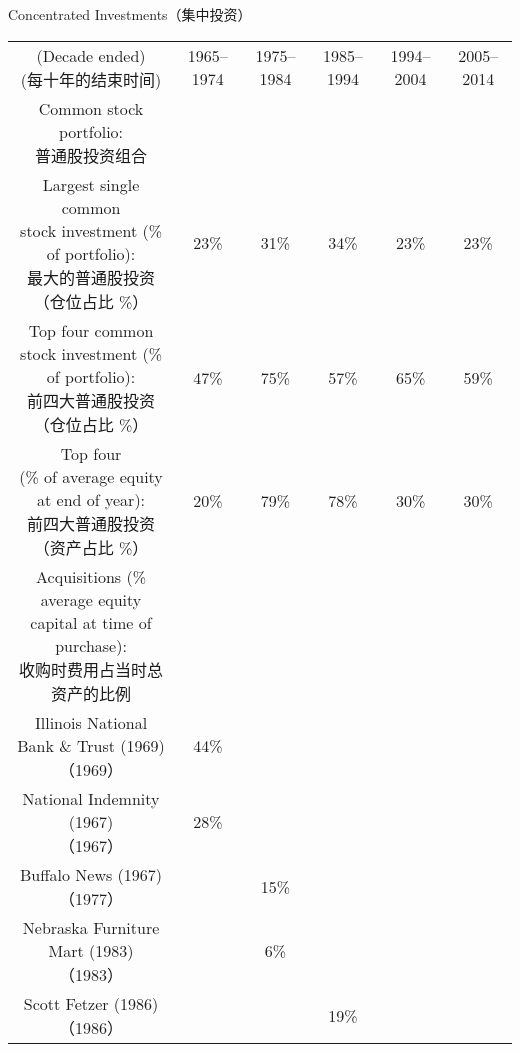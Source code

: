 \begin{section}{Concentrated Investments（集中投资）}

\begin{table}[!htbp]
  \centering
  \begin{center}
    \hspace*{-2cm}
    \begin{tabular}{cccccc}
      \toprule
      \makecell[c]{(Decade ended) \\ (每十年的结束时间)} & 1965--1974 & 1975--1984 & 1985--1994 & 1994--2004 & 2005--2014 \\
      \makecell[c]{Common stock portfolio: \\ 普通股投资组合} & & & & & \\
      \makecell[c]{Largest single common \\ stock investment (\% of portfolio): \\ 最大的普通股投资（仓位占比 \%）} & 23\% & 31\% & 34\% & 23\% & 23\% \\
      \makecell[c]{Top four common \\ stock investment (\% of portfolio): \\ 前四大普通股投资（仓位占比 \%）} & 47\% & 75\% & 57\% & 65\% & 59\% \\
      \makecell[c]{Top four \\ (\% of average equity at end of year): \\ 前四大普通股投资（资产占比 \%）} & 20\% & 79\% & 78\% & 30\% & 30\% \\
      \midrule
      \makecell[c]{Acquisitions (\% average equity \\ capital at time of purchase): \\ 收购时费用占当时总资产的比例} & & & & & \\
      \makecell[c]{Illinois National Bank \& Trust (1969) \\ （1969）} & 44\% & & & & \\
      \makecell[c]{National Indemnity (1967) \\ （1967）} & 28\% & & & & \\
      \makecell[c]{Buffalo News (1967) \\ （1977）} & & 15\% & & & \\
      \makecell[c]{Nebraska Furniture Mart (1983) \\ （1983）} & & 6\% & & & \\
      \makecell[c]{Scott Fetzer (1986) \\ （1986）} & & & 19\% & & \\

\end{tabular}
\end{center}
\end{table}
\end{section}
